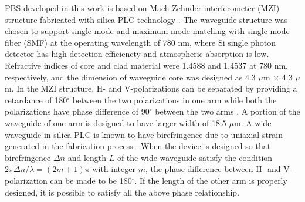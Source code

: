 \documentclass[letterpaper, 10pt]{article}
\begin{document}
PBS developed in this work is based on Mach-Zehnder interferometer (MZI) structure fabricated with silica PLC technology \cite{Kim:2012ej, Hashizume:2015ta}.
The waveguide structure was chosen to support single mode and maximum mode matching with single mode fiber (SMF) at the operating wavelength of 780 nm, where Si single photon detector has high detection efficiencty and atmospheric absorption is low.
Refractive indices of core and clad material were 1.4588 and 1.4537 at 780 nm, respectively, and the dimension of waveguide core was designed as 4.3 $\mu$m $\times$ 4.3 $\mu$m.
In the MZI structure, H- and V-polarizations can be separated by providing a retardance of 180$^\circ$  between the two polarizations in one arm while both the polarizations have phase difference of 90$^\circ$  between the two arms \cite{Kim:2012ej}.
A portion of the waveguide of one arm is designed to have larger width of 18.5 $\mu$m.
A wide waveguide in silica PLC is known to have birefringence  due to uniaxial strain generated in the fabrication process \cite{Okuno:1994fm}.
When the device is designed so that birefringence $\Delta n$ and length $L$ of the wide waveguide satisfy the condition $2\pi\Delta n/\lambda  = (2m+1) \pi$ with integer $m$, the phase difference between H- and V-polarization can be made to be 180$^\circ$.
If the length of the other arm is properly designed, it is possible to satisfy all the above phase relationship.
\end{document}

